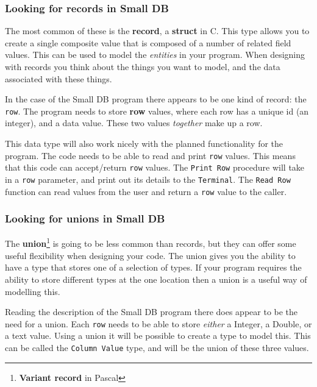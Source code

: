 \subsubsection{Looking for records in Small DB} %
\label{ssub:looking_for_records_in_small_db}

The most common of these is the \textbf{record}, a \textbf{struct} in C. This type allows you to create a single composite value that is composed of a number of related field values. This can be used to model the \emph{entities} in your program. When designing with records you think about the things you want to model, and the data associated with these things.

In the case of the Small DB program there appears to be one kind of record: the \texttt{row}. The program needs to store \textbf{row} values, where each row has a unique id (an integer), and a data value. These two values \emph{together} make up a row.

This data type will also work nicely with the planned functionality for the program. The code needs to be able to read and print \texttt{row} values. This means that this code can accept/return \texttt{row} values. The \texttt{Print Row} procedure will take in a \texttt{row} parameter, and print out its details to the \texttt{Terminal}. The \texttt{Read Row} function can read values from the user and return a \texttt{row} value to the caller.


\subsubsection{Looking for unions in Small DB} %
\label{ssub:looking_for_unions_in_small_db}

The \textbf{union}\footnote{\textbf{Variant record} in Pascal} is going to be less common than records, but they can offer some useful flexibility when designing your code. The union gives you the ability to have a type that stores one of a selection of types. If your program requires the ability to store different types at the one location then a union is a useful way of modelling this.

Reading the description of the Small DB program there does appear to be the need for a union. Each \texttt{row} needs to be able to store \emph{either} a Integer, a Double, or a text value. Using a union it will be possible to create a type to model this. This can be called the \texttt{Column Value} type, and will be the union of these three values.

